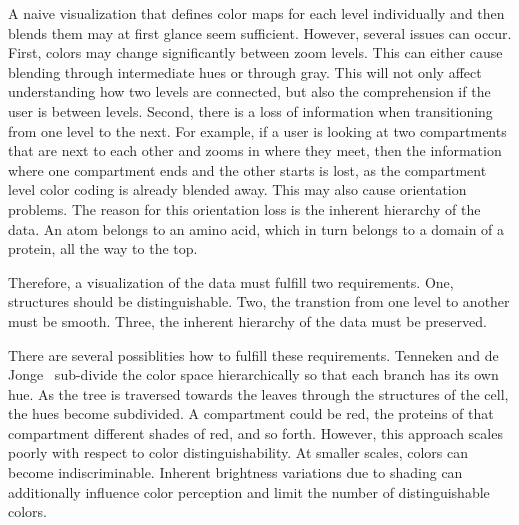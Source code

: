 \documentclass[review,journal]{vgtc}         %
\begin{document}
	A naive visualization that defines color maps for each level individually and then blends them may at first glance seem sufficient.
	However, several issues can occur.
	First, colors may change significantly between zoom levels.
	This can either cause blending through intermediate hues or through gray.
	This will not only affect understanding how two levels are connected, but also the comprehension if the user is between levels.
	Second, there is a loss of information when transitioning from one level to the next. 
	For example, if a user is looking at two compartments that are next to each other and zooms in where they meet, then the information where one compartment ends and the other starts is lost, as the compartment level color coding is already blended away. 
	This may also cause orientation problems.
	The reason for this orientation loss is the inherent hierarchy of the data.
	An atom belongs to an amino acid, which in turn belongs to a domain of a protein, all the way to the top.
	
	Therefore, a visualization of the data must fulfill two requirements. 
	One, structures should be distinguishable.
	Two, the transtion from one level to another must be smooth.
	Three, the inherent hierarchy of the data must be preserved.
	
	There are several possiblities how to fulfill these requirements. 
	Tenneken and de Jonge~\cite{tennekes2014tree} sub-divide the color space hierarchically so that each branch has its own hue.
	As the tree is traversed towards the leaves through the structures of the cell, the hues become subdivided.
	A compartment could be red, the proteins of that compartment different shades of red, and so forth.
	However, this approach scales poorly with respect to color distinguishability. At smaller scales, colors can become indiscriminable.
	Inherent brightness variations due to shading can additionally influence color perception and limit the number of distinguishable colors.
	
	
	
	
\end{document}
